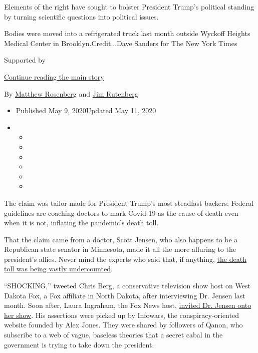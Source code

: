 Elements of the right have sought to bolster President Trump's political
standing by turning scientific questions into political issues.

Bodies were moved into a refrigerated truck last month outside Wyckoff
Heights Medical Center in Brooklyn.Credit...Dave Sanders for The New
York Times

Supported by

\protect\hyperlink{after-sponsor}{Continue reading the main story}

By
\href{https://www.nytimes3xbfgragh.onion/by/matthew-rosenberg}{Matthew
Rosenberg} and
\href{https://www.nytimes3xbfgragh.onion/by/jim-rutenberg}{Jim
Rutenberg}

\begin{itemize}
\item
  Published May 9, 2020Updated May 11, 2020
\item
  \begin{itemize}
  \item
  \item
  \item
  \item
  \item
  \item
  \end{itemize}
\end{itemize}

The claim was tailor-made for President Trump's most steadfast backers:
Federal guidelines are coaching doctors to mark Covid-19 as the cause of
death even when it is not, inflating the pandemic's death toll.

That the claim came from a doctor, Scott Jensen, who also happens to be
a Republican state senator in Minnesota, made it all the more alluring
to the president's allies. Never mind the experts who said that, if
anything,
\href{https://www.nytimes3xbfgragh.onion/interactive/2020/04/28/us/coronavirus-death-toll-total.html}{the
death toll was being vastly undercounted}.

``SHOCKING,'' tweeted Chris Berg, a conservative television show host on
West Dakota Fox, a Fox affiliate in North Dakota, after interviewing Dr.
Jensen last month. Soon after, Laura Ingraham, the Fox News host,
\href{https://www.youtube.com/watch?v=4kId_Di-wZA}{invited Dr. Jensen
onto her show}. His assertions were picked up by Infowars, the
conspiracy-oriented website founded by Alex Jones. They were shared by
followers of Qanon, who subscribe to a web of vague, baseless theories
that a secret cabal in the government is trying to take down the
president.


